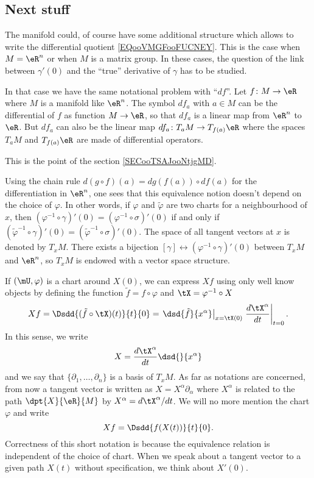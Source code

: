 \subsection{Next stuff}

    The manifold could, of course have some additional structure which allows to write the differential quotient \eqref{EQooVMGFooFUCNEY}. This is the case when \( M=\eR^n\) or when \( M\) is a matrix group. In these cases, the question of the link between \( \gamma'(0)\) and the ``true'' derivative of \( \gamma\) has to be studied.

    In that case we have the same notational problem with ``$df$''. Let \( f\colon M\to \eR\) where \( M\) is a manifold like \( \eR^n\). The symbol \( df_a\) with \( a\in M\) can be the differential of \( f\) as function \( M\to \eR\), so that \( df_a\) is a linear map from \( \eR^n\) to \( \eR\). But \( df_a\) can also be the linear map \( df_a\colon T_aM\to T_{f(a)}\eR\) where the spaces \( T_aM\) and \( T_{f(a)}\eR\) are made of differential operators.

    This is the point of the section \ref{SECooTSAJooNtjgMD}.

Using the chain rule $d(g\circ f)(a)=dg(f(a))\circ df(a)$ for the differentiation in $\eR^n$, one sees that this equivalence notion doesn't depend on the choice of $\varphi$. In other words, if $\varphi$ and $\tilde{\varphi}$ are two charts for a neighbourhood of $x$, then $(\varphi^{-1} \circ\gamma)'(0)=(\varphi^{-1} \circ\sigma)'(0)$ if and only if $(\tilde{\varphi}^{-1} \circ\gamma)'(0)=(\tilde{\varphi}^{-1} \circ\sigma)'(0)$. The space of all tangent vectors at $x$ is denoted by $T_xM$. There exists a bijection $[\gamma]\leftrightarrow (\varphi^{-1}\circ\gamma)'(0)$ between $T_xM$ and $\eR^n$, so $T_xM$ is endowed with a vector space structure.

If $(\mU,\varphi)$ is a chart around $X(0)$, we can express $Xf$ using only well know objects by defining the function $\tilde f =f\circ\varphi$ and $\tX=\varphi^{-1}\circ X$
\[
  Xf=\Dsdd{ (\tilde f \circ\tX)(t) }{t}{0}=\left.\dsd{\tilde f }{x^{\alpha}}\right|_{x=\tX(0)}\left.\frac{d\tX^{\alpha}}{dt}\right|_{t=0}.
\]
In this sense, we write
\begin{equation}
  X=\frac{d\tX^{\alpha}}{dt} \dsd{}{x^{\alpha}}
\end{equation}
and we say that $\{\partial_1,\ldots,\partial_n\}$ is a basis of $T_xM$. As far as notations are concerned, from now a tangent vector is written as $X=X^{\alpha}\partial_{\alpha}$ where $X^{\alpha}$ is related to the path $\dpt{X}{\eR}{M}$ by $X^{\alpha}=d\tX^{\alpha}/dt$. We will no more mention the chart $\varphi$ and write
\[
  Xf=\Dsdd{f(X(t))}{t}{0}.
\]
Correctness of this short notation is because the equivalence relation is independent of the choice of chart. When we speak about a tangent vector to a given path $X(t)$ without specification, we think about $X'(0)$.

